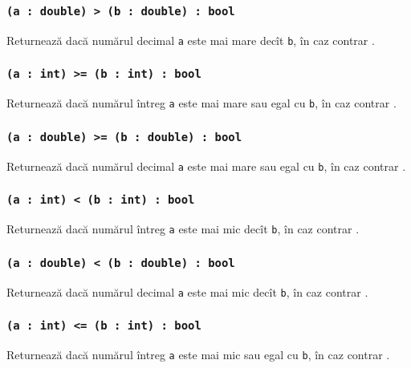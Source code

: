 \subsubsection{\texttt{(a : double) > (b : double) : bool}}

Returnează \true{} dacă numărul decimal \texttt{a} este mai mare decît \texttt{b}, în caz contrar \false{}.

\subsubsection{\texttt{(a : int) >= (b : int) : bool}}

Returnează \true{} dacă numărul întreg \texttt{a} este mai mare sau egal cu \texttt{b}, în caz contrar \false{}.

\subsubsection{\texttt{(a : double) >= (b : double) : bool}}

Returnează \true{} dacă numărul decimal \texttt{a} este mai mare sau egal cu \texttt{b}, în caz contrar \false{}.

\subsubsection{\texttt{(a : int) < (b : int) : bool}}

Returnează \true{} dacă numărul întreg \texttt{a} este mai mic decît \texttt{b}, în caz contrar \false{}.

\subsubsection{\texttt{(a : double) < (b : double) : bool}}

Returnează \true{} dacă numărul decimal \texttt{a} este mai mic decît \texttt{b}, în caz contrar \false{}.

\subsubsection{\texttt{(a : int) <= (b : int) : bool}}

Returnează \true{} dacă numărul întreg \texttt{a} este mai mic sau egal cu \texttt{b}, în caz contrar \false{}.


